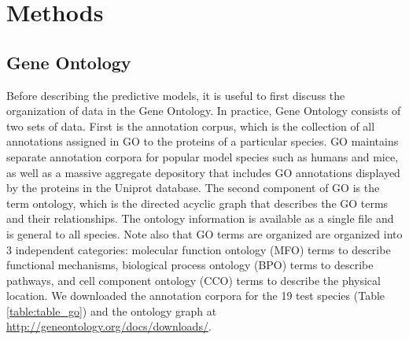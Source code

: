 \documentclass[12pt,a4paper]{report}
\begin{document}
\section{Methods}

\subsection{Gene Ontology}

Before describing the predictive models, it is useful to first discuss the organization of data in the Gene Ontology. In practice, Gene Ontology consists of two sets of data. First is the annotation corpus, which is the collection of all annotations assigned in GO to the proteins of a particular species. GO maintains separate annotation corpora for popular model species such as humans and mice, as well as a massive aggregate depository that includes GO annotations displayed by the proteins in the Uniprot database. The second component of GO is the term ontology, which is the directed acyclic graph that describes the GO terms and their relationships. The ontology information is available as a single file and is general to all species. Note also that GO terms are organized are organized into 3 independent categories: molecular function ontology (MFO) terms to describe functional mechanisms, biological process ontology (BPO) terms to describe pathways, and cell component ontology (CCO) terms to describe the physical location. We downloaded the annotation corpora for the 19 test species (Table \ref{table:table_go}) and the ontology graph at \url{http://geneontology.org/docs/downloads/}.
\end{document}
